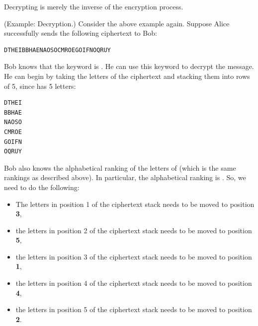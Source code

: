 \documentclass[letterpaper]{article}
\begin{document}
Decrypting is merely the inverse of the encryption process.
\begin{mdframed}
    (Example: Decryption.) Consider the above example again. Suppose Alice successfully sends the following ciphertext to Bob:
    \begin{mdframed}
        \begin{verbatim}
DTHEIBBHAENAOSOCMROEGOIFNOQRUY\end{verbatim}
    \end{mdframed}
    Bob knows that the keyword is . He can use this keyword to decrypt the message. He can begin by taking the letters of the ciphertext and stacking them into rows of 5, since  has 5 letters:
    \begin{mdframed}
        \begin{verbatim}
DTHEI
BBHAE
NAOSO
CMROE
GOIFN
OQRUY\end{verbatim}
    \end{mdframed}
    Bob also knows the alphabetical ranking of the letters of  (which is the same rankings as described above). In particular, the alphabetical ranking is . So, we need to do the following: 
    \begin{itemize}
        \item The letters in position 1 of the ciphertext stack needs to be moved to position \textbf{3},
        \item the letters in position 2 of the ciphertext stack needs to be moved to position \textbf{5},
        \item the letters in position 3 of the ciphertext stack needs to be moved to position \textbf{1},
        \item the letters in position 4 of the ciphertext stack needs to be moved to position \textbf{4},
        \item the letters in position 5 of the ciphertext stack needs to be moved to position \textbf{2}. 
    \end{itemize}
    

\end{mdframed}
\end{document}
